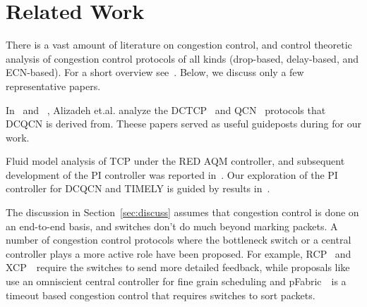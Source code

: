\section{Related Work}
\label{sec:related}

There is a vast amount of literature on congestion control, and control
theoretic analysis of congestion control protocols of all kinds (drop-based,
delay-based, and ECN-based). For a short overview see~\cite{srikantbook}. Below,
we discuss only a few representative papers.

In~\cite{dctcp-analysis} and ~\cite{qcn-analysis}, Alizadeh et.al. analyze the
DCTCP~\cite{dctcp} and QCN~\cite{qcn} protocols that DCQCN is derived from. Theese papers served as useful guideposts during for our work.

Fluid model analysis of TCP under the RED AQM controller, and subsequent
development of the PI controller was reported
in~\cite{misra2000fluid,hollot2001designing}. Our exploration of the PI
controller for DCQCN and TIMELY is guided by results
in~\cite{hollot2001designing}.

The discussion in Section~\ref{sec:discuss} assumes that congestion control is
done on an end-to-end basis, and switches don't do much beyond marking packets.
A number of congestion control protocols where the bottleneck switch or a
central controller plays a more active role have been proposed. For example,
RCP~\cite{dukkipati2006rcp} and XCP~\cite{katabi2002congestion}~require the switches to send more detailed
feedback, while proposals like~\cite{vattikonda2012practical,wilson2011better}
use an omniscient central controller for fine grain scheduling and pFabric~\cite{pfabric}~is a timeout based congestion control that requires switches to sort packets. 



